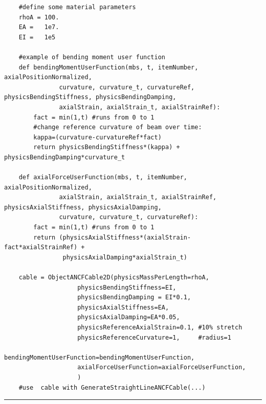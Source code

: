     \pythonstyle\begin{lstlisting}
    #define some material parameters
    rhoA = 100.
    EA =   1e7.
    EI =   1e5

    #example of bending moment user function
    def bendingMomentUserFunction(mbs, t, itemNumber, axialPositionNormalized, 
               curvature, curvature_t, curvatureRef, physicsBendingStiffness, physicsBendingDamping,
               axialStrain, axialStrain_t, axialStrainRef):
        fact = min(1,t) #runs from 0 to 1
        #change reference curvature of beam over time:
        kappa=(curvature-curvatureRef*fact) 
        return physicsBendingStiffness*(kappa) + physicsBendingDamping*curvature_t

    def axialForceUserFunction(mbs, t, itemNumber, axialPositionNormalized, 
               axialStrain, axialStrain_t, axialStrainRef, physicsAxialStiffness, physicsAxialDamping,
               curvature, curvature_t, curvatureRef):
        fact = min(1,t) #runs from 0 to 1
        return (physicsAxialStiffness*(axialStrain-fact*axialStrainRef) + 
                physicsAxialDamping*axialStrain_t)

    cable = ObjectANCFCable2D(physicsMassPerLength=rhoA, 
                    physicsBendingStiffness=EI, 
                    physicsBendingDamping = EI*0.1,
                    physicsAxialStiffness=EA,
                    physicsAxialDamping=EA*0.05,
                    physicsReferenceAxialStrain=0.1, #10% stretch
                    physicsReferenceCurvature=1,     #radius=1
                    bendingMomentUserFunction=bendingMomentUserFunction,
                    axialForceUserFunction=axialForceUserFunction,
                    )
    #use  cable with GenerateStraightLineANCFCable(...)
    \end{lstlisting} \vspace{12pt}
\vspace{6pt}\par\noindent\rule{\textwidth}{0.4pt}
\label{miniExample_ObjectANCFCable2D}
\pythonstyle
